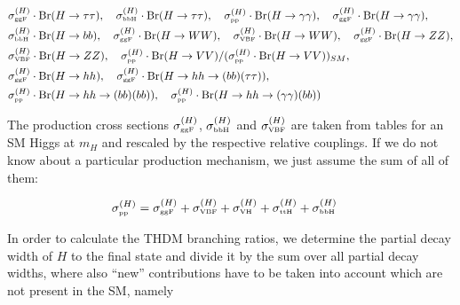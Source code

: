 \documentclass[aps,superscriptaddress,nofootinbib,floatfix,notitlepage]{revtex4-1}
\begin{document}
\begin{align}
& \sigma ^{(H)}_{\text{\tiny{ggF}}} \cdot {\rm Br}(H\to \tau \tau ) , \quad \sigma ^{(H)}_{\text{\tiny{bbH}}} \cdot {\rm Br}(H\to \tau \tau ), \quad\sigma ^{(H)}_{\text{\tiny{pp}}} \cdot {\rm Br}(H\to \gamma \gamma ) , \quad \sigma ^{(H)}_{\text{\tiny{ggF}}} \cdot {\rm Br}(H\to \gamma \gamma ), \nonumber \\ %
& \sigma ^{(H)}_{\text{\tiny{bbH}}} \cdot {\rm Br}(H\to bb), \quad \sigma ^{(H)}_{\text{\tiny{ggF}}} \cdot {\rm Br}(H\to WW) , \quad \sigma ^{(H)}_{\text{\tiny{VBF}}} \cdot {\rm Br}(H\to WW), \quad \sigma ^{(H)}_{\text{\tiny{ggF}}} \cdot {\rm Br}(H\to ZZ), \nonumber \\ %
& \sigma ^{(H)}_{\text{\tiny{VBF}}} \cdot {\rm Br}(H\to ZZ), \quad \sigma ^{(H)}_{\text{\tiny{pp}}} \cdot {\rm Br}(H\to VV) /  (\sigma ^{(H)}_{\text{\tiny{pp}}} \cdot {\rm Br}(H\to VV) )_{SM}, \nonumber \\ %
& \sigma ^{(H)}_{\text{\tiny{ggF}}} \cdot {\rm Br}(H\to hh) , \quad \sigma ^{(H)}_{\text{\tiny{ggF}}} \cdot {\rm Br}(H\to hh \to (bb)(\tau \tau )), \nonumber \\ %
& \sigma ^{(H)}_{\text{\tiny{pp}}} \cdot {\rm Br}(H\to hh \to (bb)(bb)) , \quad \sigma ^{(H)}_{\text{\tiny{pp}}} \cdot {\rm Br}(H\to hh \to (\gamma \gamma )(bb)) \nonumber %
\end{align}

The production cross sections $\sigma ^{(H)}_{\text{\tiny{ggF}}}$, $\sigma ^{(H)}_{\text{\tiny{bbH}}}$ and $\sigma ^{(H)}_{\text{\tiny{VBF}}}$ are taken from tables for an SM Higgs at $m_H$ and rescaled by the respective relative couplings. If we do not know about a particular production mechanism, we just assume the sum of all of them:

\begin{align}
 \sigma ^{(H)}_{\text{\tiny{pp}}} &= \sigma ^{(H)}_{\text{\tiny{ggF}}} + \sigma ^{(H)}_{\text{\tiny{VBF}}} + \sigma ^{(H)}_{\text{\tiny{VH}}} + \sigma ^{(H)}_{\text{\tiny{ttH}}} + \sigma ^{(H)}_{\text{\tiny{bbH}}} \nonumber
\end{align}

In order to calculate the THDM branching ratios, we determine the partial decay width of $H$ to the final state and divide it by the sum over all partial decay widths, where also ``new'' contributions have to be taken into account which are not present in the SM, namely
\end{document}
